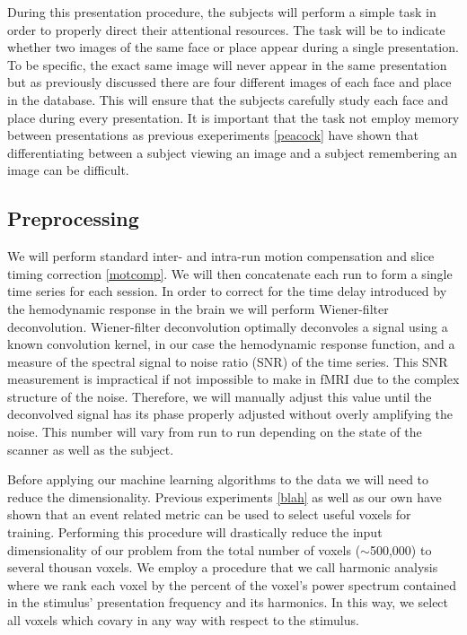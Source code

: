 \documentclass[12pt]{article}
\begin{document}
During this presentation procedure, the subjects will perform a simple task in order to properly direct their attentional resources.
The task will be to indicate whether two images of the same face or place appear during a single presentation.
To be specific, the exact same image will never appear in the same presentation but as previously discussed there are four different images of each face and place in the database.
This will ensure that the subjects carefully study each face and place during every presentation.
It is important that the task not employ memory between presentations as previous exeperiments \ref{peacock} have shown that differentiating between a subject viewing an image and a subject remembering an image can be difficult.


\subsection{Preprocessing}
We will perform standard inter- and intra-run motion compensation and slice timing correction \ref{motcomp}.
We will then concatenate each run to form a single time series for each session.
In order to correct for the time delay introduced by the hemodynamic response in the brain we will perform Wiener-filter deconvolution.
Wiener-filter deconvolution optimally deconvoles a signal using a known convolution kernel, in our case the hemodynamic response function, and a measure of the spectral signal to noise ratio (SNR) of the time series.
This SNR measurement is impractical if not impossible to make in fMRI due to the complex structure of the noise.
Therefore, we will manually adjust this value until the deconvolved signal has its phase properly adjusted without overly amplifying the noise.
This number will vary from run to run depending on the state of the scanner as well as the subject.

Before applying our machine learning algorithms to the data we will need to reduce the dimensionality.
Previous experiments \ref{blah} as well as our own have shown that an event related metric can be used to select useful voxels for training.
Performing this procedure will drastically reduce the input dimensionality of our problem from the total number of voxels ($\sim$500,000) to several thousan voxels.
We employ a procedure that we call harmonic analysis where we rank each voxel by the percent of the voxel's power spectrum contained in the stimulus' presentation frequency and its harmonics.
In this way, we select all voxels which covary in any way with respect to the stimulus.
\end{document}
